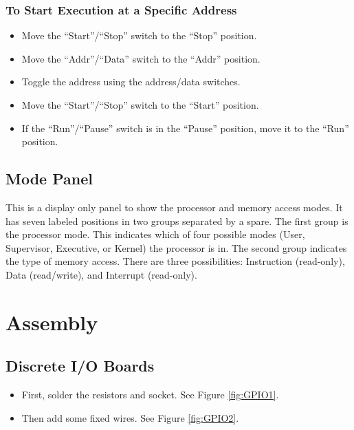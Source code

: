 \documentclass[10pt, openany]{book}
\newcommand{\switch}[2]{``#1''/``#2''}
\newcommand{\position}[1]{``#1''}
\begin{document}
\subsubsection{To Start Execution at a Specific Address}
\begin{itemize}
  \item Move the \switch{Start}{Stop} switch to the \position{Stop} position.
  \item Move the \switch{Addr}{Data} switch to the \position{Addr} position.
  \item Toggle the address using the address/data switches.
  \item Move the \switch{Start}{Stop} switch to the \position{Start} position.
  \item If the \switch{Run}{Pause} switch is in the \position{Pause} position, move it to the \position{Run} position.
\end{itemize}

\subsection{Mode Panel}
This is a display only panel to show the processor and memory access modes.  It has seven labeled positions in two groups separated by a spare.  The first group is the processor mode.  This indicates which of four possible modes (User, Supervisor, Executive, or Kernel) the processor is in.  The second group indicates the type of memory access.  There are three possibilities: Instruction (read-only), Data (read/write), and Interrupt (read-only).

\section{Assembly}

\subsection{Discrete I/O Boards}
\begin{itemize}
  \item First, solder the resistors and socket.  See Figure \ref{fig:GPIO1}.
  \item Then add some fixed wires.  See Figure \ref{fig:GPIO2}.
\end{itemize}
\end{document}
